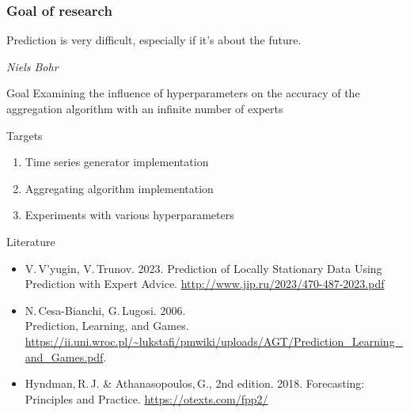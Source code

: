 \documentclass{beamer}
\begin{document}
\begin{frame}
\frametitle{Goal of research}
\setlength{}
\epigraph{Prediction is very difficult, especially if it's about the future.}{\textit{Niels Bohr}}

\begin{block}{Goal}
Examining the influence of hyperparameters on the accuracy of the aggregation algorithm with an infinite number of experts
\end{block}


\begin{block}{Targets}
\begin{enumerate}
\item Time series generator implementation
\item Aggregating algorithm implementation
\item Experiments with various hyperparameters    
\end{enumerate}
\end{block}



\end{frame}

\begin{frame}{Literature}
    \begin{itemize}
    \item V.\,V’yugin, V.\,Trunov. 2023. Prediction of Locally Stationary Data Using Prediction with
Expert Advice. \url{http://www.jip.ru/2023/470-487-2023.pdf}
    
    \item N.\,Cesa-Bianchi, G.\,Lugosi. 2006. \\
    Prediction, Learning, and Games.
    \url{https://ii.uni.wroc.pl/~lukstafi/pmwiki/uploads/AGT/Prediction_Learning_and_Games.pdf}.
    
    \item Hyndman,\,R.\,J. \& Athanasopoulos,\,G., 2nd edition. 2018. Forecasting: Principles and Practice. \url{https://otexts.com/fpp2/}
%
%
  
    \end{itemize}
\end{frame}
\end{document}
